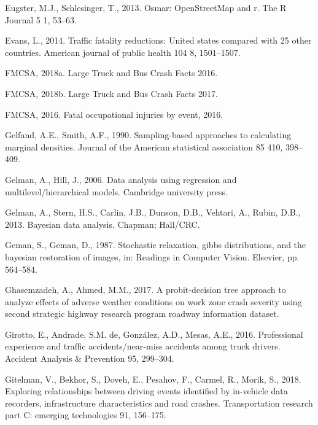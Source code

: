 \documentclass[12pt]{book}
\numberwithin{equation}{chapter}
\begin{document}
\leavevmode\hypertarget{ref-eugster2013osmar}{}%
Eugster, M.J., Schlesinger, T., 2013. Osmar: OpenStreetMap and r. The R Journal 5 1, 53--63.

\leavevmode\hypertarget{ref-evans2014traffic}{}%
Evans, L., 2014. Traffic fatality reductions: United states compared with 25 other countries. American journal of public health 104 8, 1501--1507.

\leavevmode\hypertarget{ref-fmcsareport2016}{}%
FMCSA, 2018a. Large Truck and Bus Crash Facts 2016.

\leavevmode\hypertarget{ref-fmcsareport2017}{}%
FMCSA, 2018b. Large Truck and Bus Crash Facts 2017.

\leavevmode\hypertarget{ref-fmcsafacts2016}{}%
FMCSA, 2016. Fatal occupational injuries by event, 2016.

\leavevmode\hypertarget{ref-gelfand1990sampling}{}%
Gelfand, A.E., Smith, A.F., 1990. Sampling-based approaches to calculating marginal densities. Journal of the American statistical association 85 410, 398--409.

\leavevmode\hypertarget{ref-gelman2006data}{}%
Gelman, A., Hill, J., 2006. Data analysis using regression and multilevel/hierarchical models. Cambridge university press.

\leavevmode\hypertarget{ref-gelman2013bayesian}{}%
Gelman, A., Stern, H.S., Carlin, J.B., Dunson, D.B., Vehtari, A., Rubin, D.B., 2013. Bayesian data analysis. Chapman; Hall/CRC.

\leavevmode\hypertarget{ref-geman1987stochastic}{}%
Geman, S., Geman, D., 1987. Stochastic relaxation, gibbs distributions, and the bayesian restoration of images, in: Readings in Computer Vision. Elsevier, pp. 564--584.

\leavevmode\hypertarget{ref-ghasemzadeh2017probit}{}%
Ghasemzadeh, A., Ahmed, M.M., 2017. A probit-decision tree approach to analyze effects of adverse weather conditions on work zone crash severity using second strategic highway research program roadway information dataset.

\leavevmode\hypertarget{ref-girotto2016professional}{}%
Girotto, E., Andrade, S.M. de, González, A.D., Mesas, A.E., 2016. Professional experience and traffic accidents/near-miss accidents among truck drivers. Accident Analysis \& Prevention 95, 299--304.

\leavevmode\hypertarget{ref-gitelman2018exploring}{}%
Gitelman, V., Bekhor, S., Doveh, E., Pesahov, F., Carmel, R., Morik, S., 2018. Exploring relationships between driving events identified by in-vehicle data recorders, infrastructure characteristics and road crashes. Transportation research part C: emerging technologies 91, 156--175.
\end{document}
